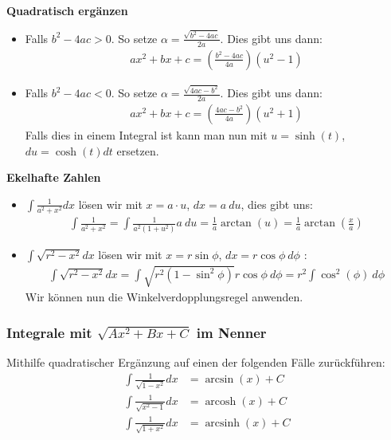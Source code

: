 \documentclass[25pt]{sciposter}
\newenvironment{method}[1]{\begin{mdframed}[backgroundcolor=blue!10,innertopmargin=15pt, innerbottommargin=15pt, nobreak=true]
		\textbf{#1 }
	}
	{ 
	\end{mdframed}
}
\begin{document}
\begin{multicols}{3}
\begin{method}{Quadratisch ergänzen}
\begin{itemize}
	\item Falls $b^2 - 4ac > 0$. So setze $\alpha = \frac{\sqrt{b^2 - 4ac}}{2a}$. Dies gibt uns dann:
	\begin{align*}
		ax^2 + bx + c = \left(\frac{b^2 -4ac}{4a}\right)\left(u^2 - 1\right)
	\end{align*}
	
	\item Falls $b^2 - 4ac < 0$. So setze $\alpha = \frac{\sqrt{4ac - b^2}}{2a}$. Dies gibt uns dann:
	\begin{align*}
	ax^2 + bx + c = \left(\frac{4ac - b^2}{4a}\right)\left(u^2 + 1\right)
	\end{align*}
	Falls dies in einem Integral ist kann man nun mit $u=\sinh(t)$, $du = \cosh(t) dt$ ersetzen.
\end{itemize}

\end{method}

\begin{method}{Ekelhafte Zahlen}
	
	\begin{itemize}
	\item $\int \frac{1}{a^2 + x^2} dx$ lösen wir mit $x=a\cdot u$, $dx = a \ du$, dies gibt uns:
	\begin{align*}
		\int \frac{1}{a^2 + x^2} = \int\frac{1}{a^2 (1 + u^2)} a \ du = \frac{1}{a} \arctan(u) = \frac{1}{a} \arctan\left(\frac{x}{a}\right)
	\end{align*}
	
	\item $\int \sqrt{r^2 - x^2} dx$ lösen wir mit $x = r \sin \phi$, $dx = r \cos \phi \ d\phi$ :
	\begin{align*}
\int \sqrt{r^2 - x^2} dx = \int \sqrt{r^2 (1-\sin^2 \phi)} r \cos \phi \ d\phi = r^2 \int \cos^2(\phi) \ d\phi
\end{align*}
Wir können nun die Winkelverdopplungsregel anwenden.
	\end{itemize}
	
\end{method}

\subsubsection*{Integrale mit $\sqrt{Ax^2 + Bx + C}$ im Nenner}
Mithilfe quadratischer Ergänzung auf einen der folgenden Fälle zurückführen:
\begin{align*}
\int \frac{1}{\sqrt{1-x^2}} dx &= \arcsin(x) + C\\
\int \frac{1}{\sqrt{x^2-1}} dx &= \operatorname{arcosh}(x) + C\\
\int \frac{1}{\sqrt{1+x^2}} dx &= \operatorname{arcsinh}(x) + C
\end{align*}





\end{multicols}
\end{document}
